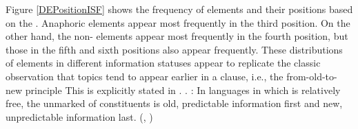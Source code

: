 Figure \ref{DEPositionISF} shows the frequency of elements and their positions
based on the .
Anaphoric elements appear most frequently in the third position.
On the other hand, the non- elements appear most frequently in the fourth position,
but those in the fifth and sixth positions also appear frequently.
These distributions of elements in different information statuses appear to replicate the classic observation that
topics tend to appear earlier in a clause,
i.e., the from-old-to-new principle \cite{mathesius28,firbas64,danes70,kuno78,gundel88}
This is explicitly stated in \Next.
%
\ex. \label{oldnewprinciple}:
 In languages in which  is relatively free,
 the unmarked  of constituents is old,
 predictable information first and new, unpredictable information last.
 \hfill{(, )}


